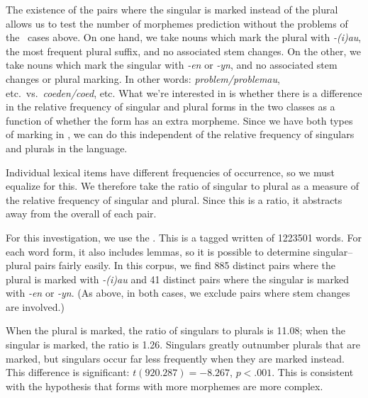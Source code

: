 \documentclass[output=paper,
modfonts
]{LSP/langsci}
\begin{document}

The existence of the pairs where the singular is marked instead of the plural allows us to test the number of morphemes prediction without the problems of the \e\ cases above. On one hand, we take nouns which mark the plural with \emph{-(i)au}, the most frequent plural suffix, and no associated stem changes. On the other, we take nouns which mark the singular with \emph{-en} or \emph{-yn}, and no associated stem changes or plural marking. In other words: \emph{problem/problemau}, etc.\ vs.\ \emph{coeden/coed}, etc. What we're interested in is whether there is a difference in the relative frequency of singular and plural forms in the two classes as a function of whether the form has an extra morpheme. Since we have both types of marking in \w, we can do this independent of the relative frequency of singulars and plurals in the language.

Individual lexical items have different frequencies of occurrence, so we must equalize for this. We therefore take the ratio of singular to plural as a measure of the relative frequency of singular and plural. Since this is a ratio, it abstracts away from the overall  of each pair.

For this investigation, we use the  \citep{ellisetal}. This is a tagged written  of 1223501 words. For each word form, it also includes lemmas, so it is possible to determine singular--plural pairs fairly easily. In this corpus, we find 885 distinct pairs where the plural is marked with \emph{-(i)au} and 41 distinct pairs where the singular is marked with \emph{-en} or \emph{-yn}. (As above, in both cases, we exclude pairs where stem changes are involved.)

When the plural is marked, the ratio of singulars to plurals is 11.08; when the singular is marked, the ratio is 1.26. Singulars greatly outnumber plurals that are marked, but singulars occur far less frequently when they are marked instead. This difference is significant: $t(920.287) = -8.267$, $p < .001$. This is consistent with the hypothesis that forms with more morphemes are more complex.
\end{document}
